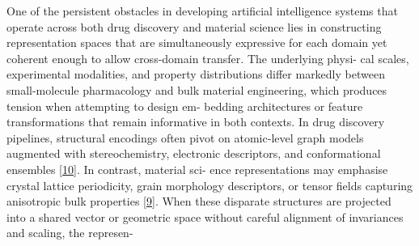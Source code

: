\documentclass[
]{article}
\begin{document}
One of the persistent obstacles in developing artificial intelligence
systems that operate across both drug discovery and material science
lies in constructing representation spaces that are simultaneously
expressive for each domain yet coherent enough to allow cross-domain
transfer. The underlying physi- cal scales, experimental modalities, and
property distributions differ markedly between small-molecule
pharmacology and bulk material engineering, which produces tension when
attempting to design em- bedding architectures or feature
transformations that remain informative in both contexts. In drug
discovery pipelines, structural encodings often pivot on atomic-level
graph models augmented with stereochemistry, electronic descriptors, and
conformational ensembles {[}\protect\hyperlink{_bookmark50}{10}{]}. In
contrast, material sci- ence representations may emphasise crystal
lattice periodicity, grain morphology descriptors, or tensor fields
capturing anisotropic bulk properties
{[}\protect\hyperlink{_bookmark49}{9}{]}. When these disparate
structures are projected into a shared vector or geometric space without
careful alignment of invariances and scaling, the represen-
\end{document}
